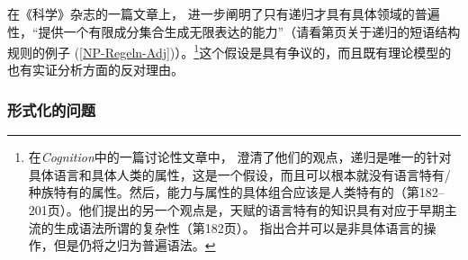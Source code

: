 在《科学》杂志的一篇文章上， \citet*{HCF2002a}进一步阐明了只有递归才具有具体领域的普遍性，“提供一个有限成分集合生成无限表达的能力”（请看第\pageref{NP-Regeln-Adj}页关于递归的短语结构规则的例子 (\ref{NP-Regeln-Adj})）。\footnote{%
在\emph{Cognition}中的一篇讨论性文章中， \citet*{FHC2005a}澄清了他们的观点，递归是唯一的针对具体语言和具体人类的属性，这是一个假设，而且可以根本就没有语言特有/种族特有的属性。然后，能力与属性的具体组合应该是人类特有的（第182--201页）。他们提出的另一个观点是，天赋的语言特有的知识具有对应于早期主流的生成语法所谓的复杂性（第182页）。
 \citet[]{Chomsky2007a}指出合并可以是非具体语言的操作，但是仍将之归为普遍语法。
}这个假设是具有争议的，而且既有理论模型的也有实证分析方面的反对理由。
%

\subsubsection{形式化的问题}

